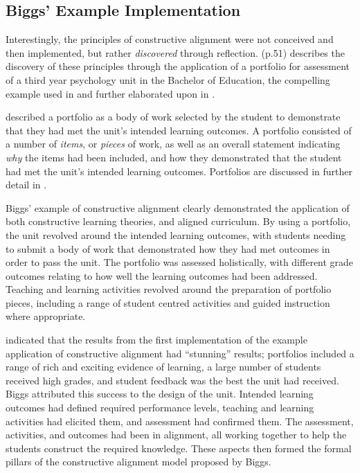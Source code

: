 
\subsection{Biggs' Example Implementation} %
\label{sub:biggs_example_implementation}

Interestingly, the principles of constructive alignment were not conceived and then implemented, but rather \emph{discovered} through reflection. \citet{Biggs:2007} (p.51) describes the discovery of these principles through the application of a portfolio for assessment of a third year psychology unit in the Bachelor of Education, the compelling example used in \citet{Biggs:1996c} and further elaborated upon in \citet{Biggs:1997}.

\citet{Biggs:1997} described a portfolio as a body of work selected by the student to demonstrate that they had met the unit's intended learning outcomes. A portfolio consisted of a number of \emph{items}, or \emph{pieces} of work, as well as an overall statement indicating \emph{why} the items had been included, and how they demonstrated that the student had met the unit's intended learning outcomes. Portfolios are discussed in further detail in .

Biggs' example of constructive alignment clearly demonstrated the application of both constructive learning theories, and aligned curriculum. By using a portfolio, the unit revolved around the intended learning outcomes, with students needing to submit a body of work that demonstrated how they had met outcomes in order to pass the unit. The portfolio was assessed holistically, with different grade outcomes relating to how well the learning outcomes had been addressed. Teaching and learning activities revolved around the preparation of portfolio pieces, including a range of student centred activities and guided instruction where appropriate.

\citet{Biggs:1996c} indicated that the results from the first implementation of the example application of constructive alignment had ``stunning'' results; portfolios included a range of rich and exciting evidence of learning, a large number of students received high grades, and student feedback was the best the unit had received. Biggs attributed this success to the design of the unit. Intended learning outcomes had defined required performance levels, teaching and learning activities had elicited them, and assessment had confirmed them. The assessment, activities, and outcomes had been in alignment, all working together to help the students construct the required knowledge. These aspects then formed the formal pillars of the constructive alignment model proposed by Biggs.

